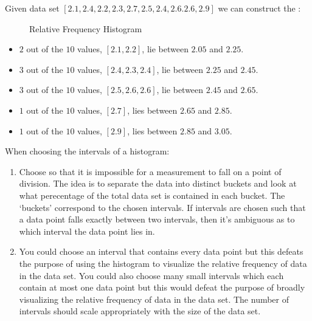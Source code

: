 \begin{note}
    Given data set $[2.1,2.4,2.2,2.3,2.7,2.5,2.4,2.6.2.6,2.9]$ we can construct the :

    \begin{figure}[h]
        \vspace{-10pt}
        \centering
        
        \vspace{-20pt}
        \caption{Relative Frequency Histogram}
        \label{fig:rfh}
    \end{figure}
    
    \begin{itemize}
        \item $2$ out of the $10$ values, $[2.1, 2.2]$, lie between $2.05$ and $2.25$.
        \item $3$ out of the $10$ values, $[2.4, 2.3, 2.4]$, lie between $2.25$ and $2.45$.
        \item $3$ out of the $10$ values, $[2.5, 2.6, 2.6]$, lie between $2.45$ and $2.65$.
        \item $1$ out of the $10$ values, $[2.7]$, lies between $2.65$ and $2.85$.
        \item $1$ out of the $10$ values, $[2.9]$, lies between $2.85$ and $3.05$.
    \end{itemize}
\end{note}

\begin{rmrk}
    When choosing the intervals of a histogram:
    \begin{enumerate}
        \item Choose so that it is impossible for a measurement to fall on a point of division. The idea is to separate the data into distinct buckets and look at what perecentage of the total data set is contained in each bucket. The `buckets' correspond to the chosen intervals. If intervals are chosen such that a data point falls exactly between two intervals, then it's ambiguous as to which interval the data point lies in.
        \item You could choose an interval that contains every data point but this defeats the purpose of using the histogram to visualize the relative frequency of data in the data set. You could also choose many small intervals which each contain at most one data point but this would defeat the purpose of broadly visualizing the relative frequency of data in the data set. The number of intervals should scale appropriately with the size of the data set.
    \end{enumerate}
\end{rmrk}

